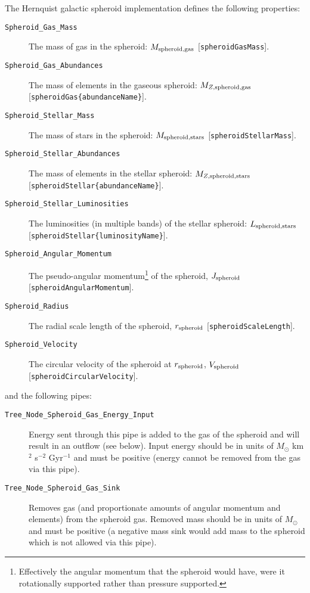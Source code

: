 The Hernquist galactic spheroid implementation defines the following properties:
\begin{description}
 \item [{\tt Spheroid\_Gas\_Mass}] The mass of gas in the spheroid: $M_{\rm spheroid, gas}$ [{\tt spheroidGasMass}].
 \item [{\tt Spheroid\_Gas\_Abundances}] The mass of elements in the gaseous spheroid: $M_{Z, {\rm spheroid, gas}}$ [{\tt spheroidGas\{abundanceName\}}].
 \item [{\tt Spheroid\_Stellar\_Mass}] The mass of stars in the spheroid: $M_{\rm spheroid, stars}$ [{\tt spheroidStellarMass}].
 \item [{\tt Spheroid\_Stellar\_Abundances}] The mass of elements in the stellar spheroid: $M_{Z, {\rm spheroid, stars}}$ [{\tt spheroidStellar\{abundanceName\}}].
 \item [{\tt Spheroid\_Stellar\_Luminosities}] The luminosities (in multiple bands) of the stellar spheroid: $L_{\rm spheroid, stars}$ [{\tt spheroidStellar\{luminosityName\}}].
 \item [{\tt Spheroid\_Angular\_Momentum}] The pseudo-angular momentum\footnote{Effectively the angular momentum that the spheroid would have, were it rotationally supported rather than pressure supported.} of the spheroid, $J_{\rm spheroid}$ [{\tt spheroidAngularMomentum}].
 \item [{\tt Spheroid\_Radius}] The radial scale length of the spheroid, $r_{\rm spheroid}$ [{\tt spheroidScaleLength}].
 \item [{\tt Spheroid\_Velocity}] The circular velocity of the spheroid at $r_{\rm spheroid}$, $V_{\rm spheroid}$ [{\tt spheroidCircularVelocity}].
\end{description}
and the following pipes:
\begin{description}
 \item [{\tt Tree\_Node\_Spheroid\_Gas\_Energy\_Input}] Energy sent through this pipe is added to the gas of the spheroid and will result in an outflow (see below). Input energy should be in units of $M_\odot$ km$^2$ s$^{-2}$ Gyr$^{-1}$ and must be positive (energy cannot be removed from the gas via this pipe).
 \item [{\tt Tree\_Node\_Spheroid\_Gas\_Sink}] Removes gas (and proportionate amounts of angular momentum and elements) from the spheroid gas. Removed mass should be in units of $M_\odot$ and must be positive (a negative mass sink would add mass to the spheroid which is not allowed via this pipe).
\end{description}

